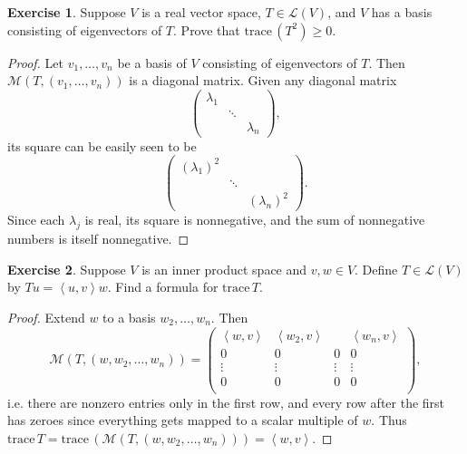 \documentclass{article}
\theoremstyle{definition}
\newtheorem{ex}{Exercise}
\begin{document}
\begin{ex}
	Suppose $V$ is a real vector space, $T \in \mathcal{L}(V)$, and $V$ has a basis consisting of eigenvectors of $T$.
	Prove that $\mathrm{trace}\,(T^2) \geq 0$.
\end{ex}
\begin{proof}
	Let $v_1, \dots, v_n$ be a basis of $V$ consisting of eigenvectors of $T$.
	Then $\mathcal{M}(T, (v_1, \dots, v_n))$ is a diagonal matrix.
	Given any diagonal matrix \begin{equation*}
		\begin{pmatrix}
			\lambda_1 &        &           \\
			          & \ddots &           \\
			          &        & \lambda_n
		\end{pmatrix},
	\end{equation*} its square can be easily seen to be \begin{equation*}
		\begin{pmatrix}
			(\lambda_1)^2 &        &               \\
			              & \ddots &               \\
			              &        & (\lambda_n)^2
		\end{pmatrix}.
	\end{equation*}
	Since each $\lambda_j$ is real, its square is nonnegative, and the sum of nonnegative numbers is itself nonnegative.
\end{proof}

\begin{ex}
	Suppose $V$ is an inner product space and $v, w \in V$.
	Define $T \in \mathcal{L}(V)$ by $Tu = {\left\langle u, v \right\rangle}w$.
	Find a formula for $\mathrm{trace}\,T$.
\end{ex}
\begin{proof}
	Extend $w$ to a basis $w_2, \dots, w_n$.
	Then \begin{equation*}
		\mathcal{M}(T, (w, w_2, \dots, w_n)) = \begin{pmatrix}
			\left\langle w, v \right\rangle & \left\langle w_2, v \right\rangle &        & \left\langle w_n, v \right\rangle \\
			0                               & 0                                 & 0      & 0                                 \\
			\vdots                          & \vdots                            & \vdots & \vdots                            \\
			0                               & 0                                 & 0      & 0                                 \\
		\end{pmatrix},
	\end{equation*}
	i.e. there are nonzero entries only in the first row, and every row after the first has zeroes since everything gets mapped to a scalar multiple of $w$.
	Thus $\mathrm{trace}\,T = \mathrm{trace}\,\left( \mathcal{M}\left( T, \left( w, w_2, \dots, w_n \right) \right) \right) = \left\langle w, v \right\rangle$.
\end{proof}
\end{document}

